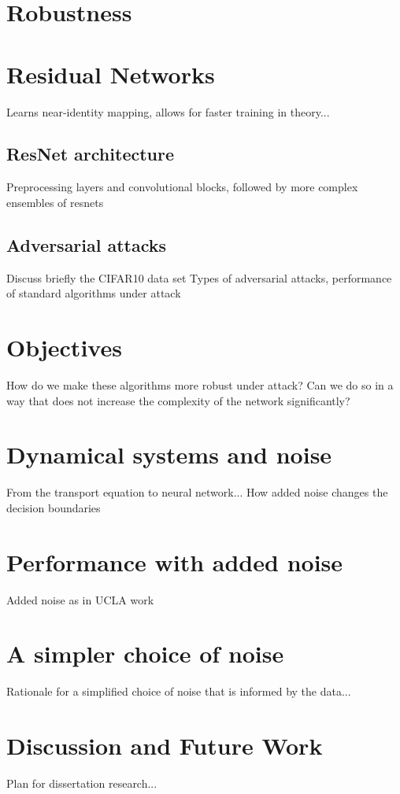 \documentclass[12pt]{article}
\begin{document}
\section*{Robustness}
\section{Residual Networks}
Learns near-identity mapping, allows for faster training in theory...
\subsection{ResNet architecture}
Preprocessing layers and convolutional blocks, followed by more complex ensembles of resnets
\subsection{Adversarial attacks}
Discuss briefly the CIFAR10 data set
Types of adversarial attacks, performance of standard algorithms under attack
\section{Objectives}
How do we make these algorithms more robust under attack? Can we do so in a way that does not increase the complexity of the network significantly?
\section{Dynamical systems and noise}
From the transport equation to neural network... How added noise changes the decision boundaries
\section{Performance with added noise}
Added noise as in UCLA work
\section{A simpler choice of noise}
Rationale for a simplified choice of noise that is informed by the data...
\section{Discussion and Future Work}
Plan for dissertation research...

\end{document}
